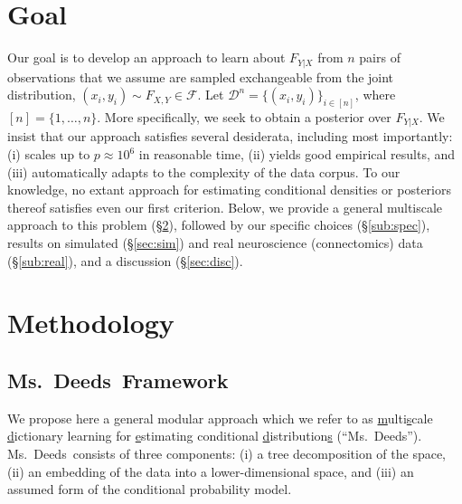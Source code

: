 \documentclass{article} %
\providecommand{\mh}[1]{\hat{#1}}
\providecommand{\mc}[1]{\mathcal{#1}}
\newcommand{\from}{{\ensuremath{\colon}}}  %
\newcommand{\conv}{\rightarrow}
\newcommand{\msd}{Ms.~Deeds}
\begin{document}
\section{Goal} \label{sec:goal}

Our goal is to develop an approach to learn about $F_{Y|X}$ from $n$ pairs of observations that we assume are sampled exchangeable from the joint distribution, $(x_i,y_i) \sim F_{X,Y} \in \mc{F}$. Let $\mc{D}^n=\{(x_i,y_i)\}_{i \in [n]}$, where $[n]=\{1,\ldots, n\}$.  More specifically, we seek to obtain a posterior over $F_{Y|X}$.  We insist that our approach satisfies several desiderata, including most importantly: (i) scales up to $p \approx 10^6$ in reasonable time,  (ii) yields good empirical results, and (iii) automatically adapts to the complexity of the data corpus.  To our knowledge, no extant approach for estimating conditional densities or posteriors thereof satisfies even our first criterion. Below, we provide a general multiscale approach to this problem (\S \ref{sec:method}), followed by our specific choices (\S \ref{sub:spec}), results on simulated (\S \ref{sec:sim}) and real neuroscience (connectomics) data (\S \ref{sub:real}), and a discussion (\S \ref{sec:disc}).

% 
% 
% 



\section{Methodology} \label{sec:method}

\subsection{\msd~Framework}

We propose here a general modular approach which we refer to as \uline{m}ulti\uline{s}cale \uline{d}ictionary learning for \uline{e}stimating conditional \uline{d}istribution\uline{s} (``\msd''). \msd~consists of three components: (i) a tree decomposition of the space, (ii) an embedding of the data into a lower-dimensional space, %
 and (iii) an assumed form of the conditional probability model. %
\end{document}
